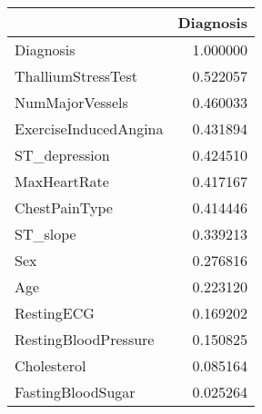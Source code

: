 \begin{tabular}{lr}
\toprule
{} &  Diagnosis \\
\midrule
Diagnosis             &   1.000000 \\
ThalliumStressTest    &   0.522057 \\
NumMajorVessels       &   0.460033 \\
ExerciseInducedAngina &   0.431894 \\
ST\_depression         &   0.424510 \\
MaxHeartRate          &   0.417167 \\
ChestPainType         &   0.414446 \\
ST\_slope              &   0.339213 \\
Sex                   &   0.276816 \\
Age                   &   0.223120 \\
RestingECG            &   0.169202 \\
RestingBloodPressure  &   0.150825 \\
Cholesterol           &   0.085164 \\
FastingBloodSugar     &   0.025264 \\
\bottomrule
\end{tabular}
